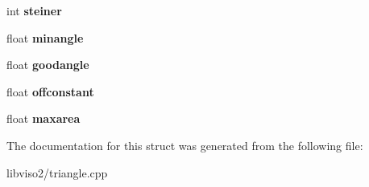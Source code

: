 \begin{DoxyCompactItemize}
\item 
\hypertarget{structbehavior_a16a49e9ff6eefec8e56016b13d8134b0}{int {\bfseries steiner}}\label{structbehavior_a16a49e9ff6eefec8e56016b13d8134b0}

\item 
\hypertarget{structbehavior_a5c57383c0560be7a12e98d47784b8c49}{float {\bfseries minangle}}\label{structbehavior_a5c57383c0560be7a12e98d47784b8c49}

\item 
\hypertarget{structbehavior_aafc7a4199e98c78bc4b645e0c6b3cd9f}{float {\bfseries goodangle}}\label{structbehavior_aafc7a4199e98c78bc4b645e0c6b3cd9f}

\item 
\hypertarget{structbehavior_a286c356869466383d028e61511da97a7}{float {\bfseries offconstant}}\label{structbehavior_a286c356869466383d028e61511da97a7}

\item 
\hypertarget{structbehavior_a7fd65328c8ab8479c4c6e14470d7f4c3}{float {\bfseries maxarea}}\label{structbehavior_a7fd65328c8ab8479c4c6e14470d7f4c3}

\end{DoxyCompactItemize}


The documentation for this struct was generated from the following file\+:\begin{DoxyCompactItemize}
\item 
libviso2/triangle.\+cpp\end{DoxyCompactItemize}
